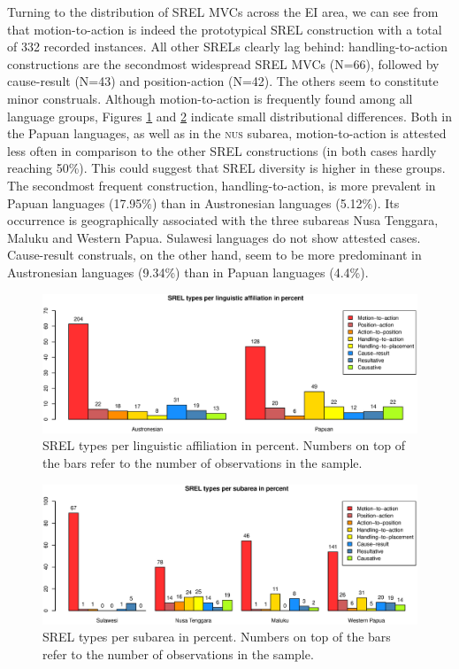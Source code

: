 Turning to the distribution of SREL MVCs across the EI area, we can see from  that motion-to-action is indeed the prototypical SREL construction with a total of 332 recorded instances. All other SRELs clearly lag behind: handling-to-action constructions are the secondmost widespread SREL MVCs (N=66), followed by cause-result (N=43) and position-action (N=42). The others seem to constitute minor construals. Although motion-to-action is frequently found among all language groups, Figures \ref{fig:srel-family} and \ref{fig:srel-group} indicate small distributional differences. Both in the Papuan languages, as well as in the \textsc{nus} subarea, motion-to-action is attested less often in comparison to the other SREL constructions (in both cases hardly reaching 50\%). This could suggest that SREL diversity is higher in these groups. The secondmost frequent construction, handling-to-action, is more prevalent in Papuan languages (17.95\%) than in Austronesian languages (5.12\%). Its occurrence is geographically associated with the three subareas Nusa Tenggara, Maluku and Western Papua. Sulawesi languages do not show attested cases. Cause-result construals, on the other hand, seem to be more predominant in Austronesian languages (9.34\%) than in Papuan languages (4.4\%).

\begin{figure}[ht]
\includegraphics[width=\columnwidth]{figures/SREL_Family.eps}
\caption[SREL types per linguistic affiliation in percent]{SREL types per linguistic affiliation in percent. Numbers on top of the bars refer to the number of observations in the sample.}\label{fig:srel-family}
\end{figure}
\begin{figure}[ht]
\includegraphics[width=\columnwidth]{figures/SREL_Group.eps}
\caption[SREL types per subarea in percent]{SREL types per subarea in percent. Numbers on top of the bars refer to the number of observations in the sample.}\label{fig:srel-group}
\end{figure}

